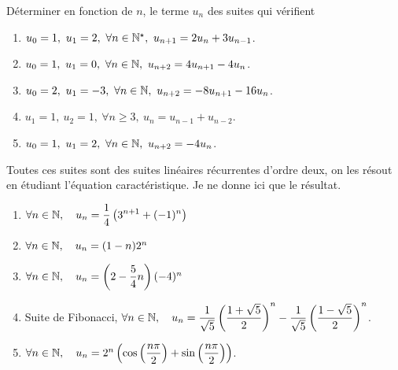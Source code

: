 \documentclass[a4paper, 11pt]{article}
\begin{document}
\vspace{0.5cm}





\begin{exercice} \;
D\'eterminer en fonction de $n$, le terme $u_n$ des suites qui v\'erifient 
\begin{enumerate}
 \item 
$u_0=1,\ u_1=2,\ \forall n\in\mathbb{N}^{\star},\ u_{n+1}=2u_n+3u_{n-1}$.
\item 
$u_0=1,\ u_1=0,\ \forall n\in\N,\ u_{n+2}=4u_{n+1}-4u_{n}$.
\item 
$u_0=2,\ u_1=-3,\ \forall n\in\N,\ u_{n+2}=-8u_{n+1}-16u_{n}$.
\item 
$u_1=1,\ u_2=1,\ \forall n\geq 3,\ u_{n}=u_{n-1}+u_{n-2}$.
\item 
$u_0=1,\ u_1=2,\ \forall n\in\N,\ u_{n+2}=-4u_{n}$.
\end{enumerate}
\end{exercice}


\begin{correction} \;
Toutes ces suites sont des suites lin\'eaires r\'ecurrentes d'ordre deux, on les r\'esout en \'etudiant l'\'equation caract\'eristique. Je ne donne ici que le r\'esultat.
\begin{enumerate}
 \item $\forall n\in\mathbb{N},\quad u_n=\displaystyle\frac{1}{4}\left( 3^{n+1}+(-1)^n \right)$
\item $\forall n\in\mathbb{N},\quad u_n=(1-n) 2^n  $
\item $\forall n\in\mathbb{N},\quad u_n=\left(2-\displaystyle\frac{5}{4}n\right)(-4)^{n}  $
\item Suite de Fibonacci, $\displaystyle \forall n\in\mathbb{N},\quad u_n=\frac{1}{\sqrt{5}}\left(\frac{1+\sqrt{5}}{2}\right)^n-\frac{1}{\sqrt{5}}\left(\frac{1-\sqrt{5}}{2}\right)^n$.
\item $\forall n\in\mathbb{N},\quad u_n=2^n\left( \cos{\left( \displaystyle\frac{n\pi}{2} \right)}+\sin{\left( \displaystyle\frac{n\pi}{2} \right)}  \right) $.
\end{enumerate}
\end{correction}
\end{document}

